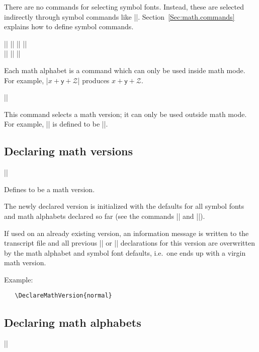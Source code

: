 \documentclass{ltxguide}[1995/11/28]
\begin{document}
There are no commands for selecting symbol fonts.  Instead, these are
selected indirectly through symbol commands like |\oplus|.
Section~\ref{Sec:math.commands} explains how to define symbol commands.

\begin{decl}
  || \quad
  || \quad
  || \quad
  || \\
  || \qquad
  || \qquad
  || 
\end{decl}
Each math alphabet is a command which can only be used inside math mode.
For example, |$x + \mathsf{y} + \mathcal{Z}$| produces
$x + \mathsf{y} + \mathcal{Z}$.

\begin{decl}
  ||
\end{decl}
This command selects a math version; it can only be used outside math
mode.  For example, |\boldmath| is defined to be ||.

\subsection{Declaring math versions}

\begin{decl}
  |\DeclareMathVersion| 
\end{decl}

Defines  to be a math version.

The newly declared version is initialized with the defaults for all
symbol fonts and math alphabets declared so far (see the commands
|\DeclareSymbolFont| and |\DeclareMathAlphabet|).

If used on an already existing version, an information message is
written to the transcript file and all previous |\SetSymbolFont| or
|\SetMathAlphabet| declarations for this version are overwritten by the
math alphabet and symbol font defaults, i.e.~one ends up with a virgin
math version.

Example:
\begin{verbatim}
   \DeclareMathVersion{normal}
\end{verbatim}

\subsection{Declaring math alphabets}

\begin{decl}
  |\DeclareMathAlphabet|   
                             
\end{decl}
\end{document}
